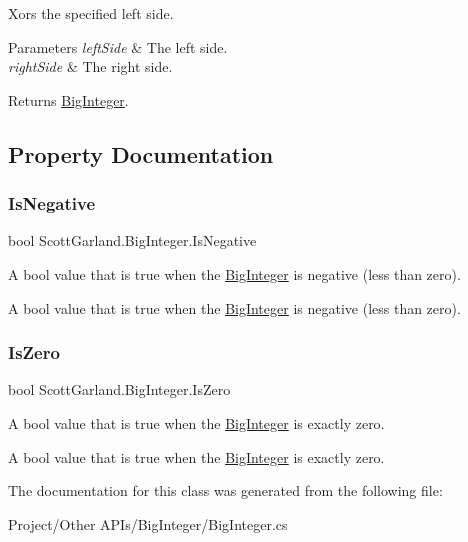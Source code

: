 Xors the specified left side. 


\begin{DoxyParams}{Parameters}
{\em left\+Side} & The left side.\\
\hline
{\em right\+Side} & The right side.\\
\hline
\end{DoxyParams}
\begin{DoxyReturn}{Returns}
\hyperlink{class_scott_garland_1_1_big_integer}{Big\+Integer}.
\end{DoxyReturn}


\subsection{Property Documentation}
\mbox{\label{class_scott_garland_1_1_big_integer_a3bed3f2524ecfac198f5d93cfccad0b0}} 
\subsubsection{\texorpdfstring{Is\+Negative}{IsNegative}}
{\footnotesize\ttfamily bool Scott\+Garland.\+Big\+Integer.\+Is\+Negative\hspace{0.3cm}{\ttfamily [get]}}



A bool value that is true when the \hyperlink{class_scott_garland_1_1_big_integer}{Big\+Integer} is negative (less than zero). 

A bool value that is true when the \hyperlink{class_scott_garland_1_1_big_integer}{Big\+Integer} is negative (less than zero). \mbox{\label{class_scott_garland_1_1_big_integer_ad925705201ff656dc819599e78a19ccd}} 
\subsubsection{\texorpdfstring{Is\+Zero}{IsZero}}
{\footnotesize\ttfamily bool Scott\+Garland.\+Big\+Integer.\+Is\+Zero\hspace{0.3cm}{\ttfamily [get]}}



A bool value that is true when the \hyperlink{class_scott_garland_1_1_big_integer}{Big\+Integer} is exactly zero. 

A bool value that is true when the \hyperlink{class_scott_garland_1_1_big_integer}{Big\+Integer} is exactly zero. 

The documentation for this class was generated from the following file\+:\begin{DoxyCompactItemize}
\item 
Project/\+Other A\+P\+Is/\+Big\+Integer/Big\+Integer.\+cs\end{DoxyCompactItemize}
